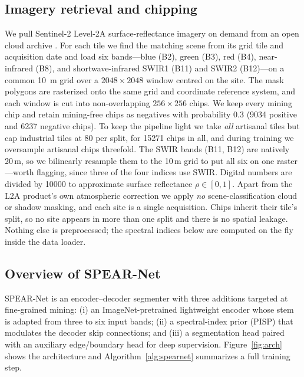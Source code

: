\documentclass[review]{elsarticle}
\begin{document}
\subsection{Imagery retrieval and chipping}\label{sec:prep}
We pull Sentinel-2 Level-2A surface-reflectance imagery on demand from an open cloud archive
\citep{planetarycomputer}. For each tile we find the matching scene from its grid tile and
acquisition date and load six bands---blue (B2), green (B3), red (B4), near-infrared (B8),
and shortwave-infrared SWIR1 (B11) and SWIR2 (B12)---on a common \SI{10}{\meter} grid over a
$2048\times2048$ window centred on the site. The mask polygons are rasterized onto the same
grid and coordinate reference system, and each window is cut into non-overlapping
$256\times256$ chips. We keep every mining chip and retain mining-free chips as negatives
with probability \num{0.3} (\num{9034} positive and \num{6237} negative chips). To keep the
pipeline light we take \emph{all} artisanal tiles but cap industrial tiles at \num{80} per
split, for \num{15271} chips in all, and during training we oversample artisanal chips
threefold. The SWIR bands (B11, B12) are natively \num{20}\,m, so we bilinearly resample
them to the \num{10}\,m grid to put all six on one raster---worth flagging, since three of
the four indices use SWIR. Digital numbers are divided by \num{10000} to approximate surface
reflectance $\rho\in[0,1]$. Apart from the L2A product's own atmospheric correction we apply
\emph{no} scene-classification cloud or shadow masking, and each site is a single
acquisition. Chips inherit their tile's split, so no site appears in more than one split and
there is no spatial leakage. Nothing else is preprocessed; the spectral indices below are
computed on the fly inside the data loader.

\subsection{Overview of SPEAR-Net}\label{sec:arch}
SPEAR-Net is an encoder--decoder segmenter with three additions targeted at fine-grained
mining: (i) an ImageNet-pretrained lightweight encoder whose stem is adapted from three to
six input bands; (ii) a spectral-index prior (PISP) that modulates the
decoder skip connections; and (iii) a segmentation head paired with an auxiliary
edge/boundary head for deep supervision. Figure~\ref{fig:arch} shows the architecture and
Algorithm~\ref{alg:spearnet} summarizes a full training step.
\end{document}
